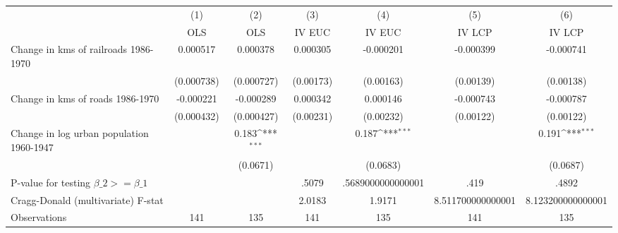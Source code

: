 {
\def\sym#1{\ifmmode^{#1}\else\(^{#1}\)\fi}
\begin{tabular}{l*{6}{c}}
\hline\hline
                &\multicolumn{1}{c}{(1)}&\multicolumn{1}{c}{(2)}&\multicolumn{1}{c}{(3)}&\multicolumn{1}{c}{(4)}&\multicolumn{1}{c}{(5)}&\multicolumn{1}{c}{(6)}\\
                &\multicolumn{1}{c}{OLS}&\multicolumn{1}{c}{OLS}&\multicolumn{1}{c}{IV EUC}&\multicolumn{1}{c}{IV EUC}&\multicolumn{1}{c}{IV LCP}&\multicolumn{1}{c}{IV LCP}\\
\hline
Change in kms of railroads 1986-1970& 0.000517         & 0.000378         & 0.000305         &-0.000201         &-0.000399         &-0.000741         \\
                &(0.000738)         &(0.000727)         &(0.00173)         &(0.00163)         &(0.00139)         &(0.00138)         \\
[1em]
Change in kms of roads 1986-1970&-0.000221         &-0.000289         & 0.000342         & 0.000146         &-0.000743         &-0.000787         \\
                &(0.000432)         &(0.000427)         &(0.00231)         &(0.00232)         &(0.00122)         &(0.00122)         \\
[1em]
Change in log urban population 1960-1947&                  &    0.183\sym{***}&                  &    0.187\sym{***}&                  &    0.191\sym{***}\\
                &                  & (0.0671)         &                  & (0.0683)         &                  & (0.0687)         \\
\hline
P-value for testing $\beta\_{2} >= \beta\_{1}$&                  &                  &    .5079         &.5689000000000001         &     .419         &    .4892         \\
Cragg-Donald (multivariate) F-stat&                  &                  &   2.0183         &   1.9171         &8.511700000000001         &8.123200000000001         \\
Observations    &      141         &      135         &      141         &      135         &      141         &      135         \\
\hline\hline
\end{tabular}
}
